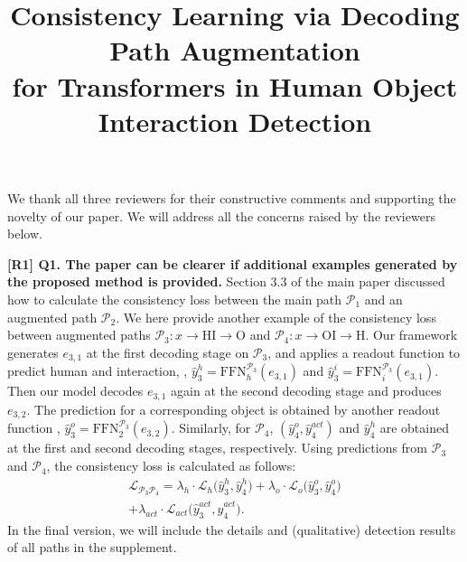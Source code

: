 \documentclass[10pt,twocolumn,letterpaper]{article}
\newcommand{\hjk}[1]{{\color{black}#1}}
\newcommand{\jhp}[1]{{\color{black}#1}}
\newcommand{\paths}{\mathcal{P}}
\begin{document}
\title{Consistency Learning via Decoding Path Augmentation \\for Transformers in Human Object Interaction Detection}  

\maketitle
\thispagestyle{empty}
\appendix
\hjk{We thank all three reviewers for their constructive comments and  supporting the novelty of our paper. 
We will address all the concerns raised by the reviewers below.


\jhp{\noindent\textbf{[R1] Q1. The paper can be clearer if additional examples generated by the proposed method is provided.}}
\newline
Section 3.3 of the main paper discussed how to calculate the consistency loss between the main path $\mathcal{P}_1$ and an augmented path $\mathcal{P}_2$.
We here provide another example of the consistency loss between augmented paths $\mathcal{P}_3: x\rightarrow\text{HI}\rightarrow\text{O}$ and $\mathcal{P}_4: x\rightarrow\text{OI}\rightarrow\text{H}$.
Our framework generates $e_{3,1}$ at the first decoding stage on $\mathcal{P}_3$, and applies a readout function to predict human and interaction, \ie, $\hat{y}_3^h=\text{FFN}_h^{\mathcal{P}_3}(e_{3,1})$ and $\hat{y}_3^i=\text{FFN}_i^{\mathcal{P}_3}(e_{3,1})$. 
Then our model decodes $e_{3,1}$ again at the second decoding stage and produces $e_{3,2}$. 
The prediction for a corresponding object is obtained by another readout function \ie, $\hat{y}_3^o=\text{FFN}_2^{\mathcal{P}_3}(e_{3,2})$.
Similarly, for $\mathcal{P}_4$, $(\hat{y}_4^o, \hat{y}_4^{act})$ and $\hat{y}_4^h$ are obtained at the first and second decoding stages, respectively.
Using predictions from $\mathcal{P}_3$ and $\mathcal{P}_4$, the consistency loss is calculated as follows:
\setlength{\abovedisplayskip}{-1pt}
\begin{equation}
\begin{split}
     \mathcal{L}_{\paths_{3}\paths_4}=\lambda_h\cdot\mathcal{L}_{h}\big(\hat{y}_3^{h},\hat{y}_4^{h}\big)  +\lambda_o\cdot
     \mathcal{L}_{o}\big(\hat{y}_3^{o},\hat{y}_4^{o}\big) \\ +\lambda_{act}\cdot\mathcal{L}_{act}\big(\hat{y}_3^{act},\hat{y}_4^{act}\big). 
\end{split}
\end{equation}
In the final version, we will include the details and (qualitative) detection results of all paths in the supplement.}
\end{document}
